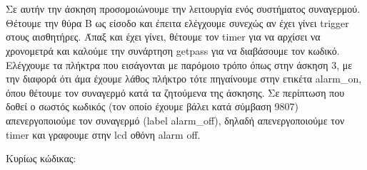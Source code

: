 \section{}

Σε αυτήν την άσκηση προσομοιώνουμε την λειτουργία ενός συστήματος συναγερμού.
Θέτουμε την θύρα Β ως είσοδο και έπειτα ελέγχουμε συνεχώς αν έχει γίνει
trigger στους αισθητήρες. Άπαξ και έχει γίνει, θέτουμε τον timer για να
αρχίσει να χρονομετρά και καλούμε την συνάρτηση getpass για να διαβάσουμε τον
κωδικό. Ελέγχουμε τα πλήκτρα που εισάγονται με παρόμοιο τρόπο όπως στην άσκηση
3, με την διαφορά ότι άμα έχουμε λάθος πλήκτρο τότε πηγαίνουμε στην ετικέτα
alarm\_on, όπου θέτουμε τον συναγερμό κατά τα ζητούμενα της άσκησης. Σε
περίπτωση που δοθεί ο σωστός κωδικός (τον οποίο έχουμε βάλει κατά σύμβαση
9807) απενεργοποιούμε τον συναγερμό (label alarm\_off), δηλαδή απενεργοποιούμε
τον timer και γραφουμε στην lcd οθόνη alarm off.

\noindent Κυρίως κώδικας:
\inputminted[linenos,obeytabs,fontsize=\footnotesize]{c}{files/part5.S}
